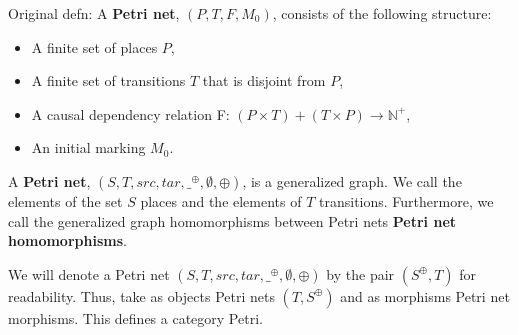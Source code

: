 \begin{definition}
  \label{def:Original-Petri-Net}
  Original defn: A \textbf{Petri net}, $(P, T, F, M_0)$, consists of the following structure:  
  \begin{itemize}
  \item A finite set of places $P$,
  \item A finite set of transitions $T$ that is disjoint from $P$,
  \item A causal dependency relation F: $(P \times T) + (T \times P) \to \mathbb{N}^+ $, 
  \item An initial marking $M_0$.
  \end{itemize}
\end{definition}
%
\begin{definition}
  \label{def:Petri-Net}
  A \textbf{Petri net}, $(S, T, src,
  tar,\_^{\oplus},\emptyset,\oplus)$, is a generalized graph.  We call
  the elements of the set $S$ places and the elements of $T$
  transitions.  Furthermore, we call the generalized graph
  homomorphisms between Petri nets \textbf{Petri net homomorphisms}.
\end{definition}
We will denote a Petri net $(S, T, src,
tar,\_^{\oplus},\emptyset,\oplus)$ by the pair $(S^\oplus,T)$ for
readability. 
%
%
%
Thus, take as objects Petri nets $(T, S^\oplus)$ and as morphisms Petri net morphisms. This defines a category Petri.
